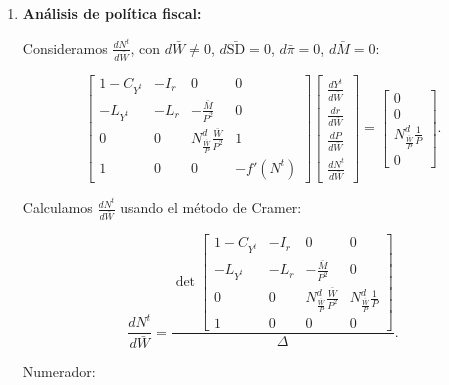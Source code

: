 \documentclass[
  doc,
  floatsintext,
  longtable,
  a4paper,
  nolmodern,
  notxfonts,
  notimes,
  12pt,
  colorlinks=true,linkcolor=blue,citecolor=blue,urlcolor=blue]{apa7}
\begin{document}
\begin{enumerate}
  Dado que \(L_r < 0\), \(I_r < 0\), \(1 - C_{Y^t} > 0\),
  \(L_{Y^t} > 0\), \(f'(N^t) > 0\), \(N^d_{\frac{\bar{W}}{P}} < 0\),
  \(\bar{M} > 0\), \(P > 0\), el signo de \(\Delta\) depende de los
  valores, pero típicamente \(\Delta < 0\).
\item
  \textbf{Análisis de política fiscal:}

  Consideramos \(\frac{dN^t}{d\bar{W}}\), con \(d\bar{W} \neq 0\),
  \(d\bar{\mathrm{SD}} = 0\), \(d\bar{\pi} = 0\), \(d\bar{M} = 0\):

  \[
  \begin{bmatrix}
  1 - C_{Y^t} & -I_r & 0 & 0 \\
  -L_{Y^t} & -L_r & -\frac{\bar{M}}{P^2} & 0 \\
  0 & 0 & N^d_{\frac{\bar{W}}{P}} \frac{\bar{W}}{P^2} & 1 \\
  1 & 0 & 0 & -f'(N^t)
  \end{bmatrix}
  \begin{bmatrix}
  \frac{dY^t}{d\bar{W}} \\
  \frac{dr}{d\bar{W}} \\
  \frac{dP}{d\bar{W}} \\
  \frac{dN^t}{d\bar{W}}
  \end{bmatrix}
  =
  \begin{bmatrix}
  0 \\
  0 \\
  N^d_{\frac{\bar{W}}{P}} \frac{1}{P} \\
  0
  \end{bmatrix}.
  \]

  Calculamos \(\frac{dN^t}{d\bar{W}}\) usando el método de Cramer:

  \[
  \frac{dN^t}{d\bar{W}} = \frac{\det \begin{bmatrix}
  1 - C_{Y^t} & -I_r & 0 & 0 \\
  -L_{Y^t} & -L_r & -\frac{\bar{M}}{P^2} & 0 \\
  0 & 0 & N^d_{\frac{\bar{W}}{P}} \frac{\bar{W}}{P^2} & N^d_{\frac{\bar{W}}{P}} \frac{1}{P} \\
  1 & 0 & 0 & 0
  \end{bmatrix}}{\Delta}.
  \]

  Numerador:


\end{enumerate}
\end{document}
